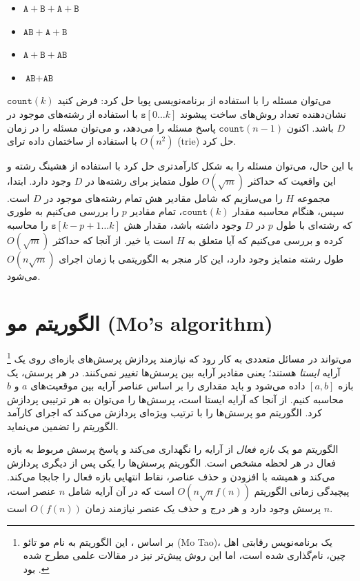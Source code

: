 \begin{itemize}[noitemsep]
\item $\texttt{A}+\texttt{B}+\texttt{A}+\texttt{B}$
\item $\texttt{AB}+\texttt{A}+\texttt{B}$
\item $\texttt{A}+\texttt{B}+\texttt{AB}$
\item $\texttt{AB}+\texttt{AB}$
\end{itemize}

می‌توان مسئله را با استفاده از برنامه‌نویسی پویا حل کرد:
فرض کنید $\texttt{count}(k)$ نشان‌دهنده تعداد روش‌های ساخت پیشوند
$\texttt{s}[0 \ldots k]$ با استفاده از رشته‌های موجود در $D$ باشد.
اکنون $\texttt{count}(n-1)$ پاسخ مسئله را می‌دهد،
و می‌توان مسئله را در زمان $O(n^2)$
با استفاده از ساختمان داده ترای (trie) حل کرد.

با این حال، می‌توان مسئله را به شکل کارآمدتری حل کرد
با استفاده از هشینگ رشته و این واقعیت که
حداکثر $O(\sqrt m)$ طول متمایز برای رشته‌ها در $D$ وجود دارد.
ابتدا، مجموعه $H$ را می‌سازیم که شامل مقادیر هش
تمام رشته‌های موجود در $D$ است.
سپس، هنگام محاسبه مقدار $\texttt{count}(k)$،
تمام مقادیر $p$ را بررسی می‌کنیم
به طوری که رشته‌ای با طول $p$ در $D$ وجود داشته باشد،
مقدار هش $\texttt{s}[k-p+1 \ldots k]$ را محاسبه کرده
و بررسی می‌کنیم که آیا متعلق به $H$ است یا خیر.
از آنجا که حداکثر $O(\sqrt m)$ طول رشته متمایز وجود دارد،
این کار منجر به الگوریتمی با زمان اجرای $O(n \sqrt m)$ می‌شود.

\section{الگوریتم مو (Mo's algorithm)}


\footnote{بر اساس \cite{cod15}، این الگوریتم به نام مو تائو (Mo Tao)، یک برنامه‌نویس رقابتی اهل چین، نام‌گذاری شده است، اما این روش پیش‌تر نیز در مقالات علمی مطرح شده بود \cite{ken06}.}
می‌تواند در مسائل متعددی به کار رود که نیازمند پردازش پرسش‌های بازه‌ای روی یک آرایه \emph{ایستا} هستند؛ یعنی مقادیر آرایه بین پرسش‌ها تغییر نمی‌کنند.
در هر پرسش، یک بازه $[a,b]$ داده می‌شود و باید مقداری را بر اساس عناصر آرایه بین موقعیت‌های $a$ و $b$ محاسبه کنیم.
از آنجا که آرایه ایستا است، پرسش‌ها را می‌توان به هر ترتیبی پردازش کرد.
الگوریتم مو پرسش‌ها را با ترتیب ویژه‌ای پردازش می‌کند که اجرای کارآمد الگوریتم را تضمین می‌نماید.

الگوریتم مو یک \emph{بازه فعال} از آرایه را نگهداری می‌کند و پاسخ پرسش مربوط به بازه فعال در هر لحظه مشخص است.
الگوریتم پرسش‌ها را یکی پس از دیگری پردازش می‌کند و همیشه با افزودن و حذف عناصر، نقاط انتهایی بازه فعال را جابجا می‌کند.
پیچیدگی زمانی الگوریتم $O(n \sqrt n f(n))$ است که در آن آرایه شامل $n$ عنصر است، $n$ پرسش وجود دارد و هر درج و حذف یک عنصر نیازمند زمان $O(f(n))$ است.

